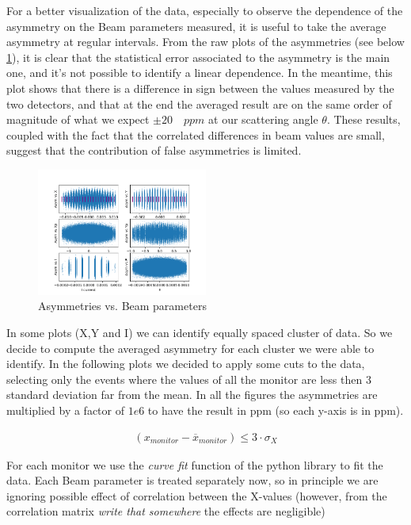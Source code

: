 For a better visualization of the data, especially to observe the dependence of the asymmetry on the Beam parameters measured, it is useful to take the average asymmetry at regular intervals. From the raw plots of the asymmetries (see below \ref{fig:asyvsparam}), it is clear that the statistical error associated to the asymmetry is the main one, and it's not possible to identify a linear dependence. In the meantime, this plot shows that there is a difference in sign between the values ​​measured by the two detectors, and that at the end the averaged result are on the same order of magnitude of what we expect $\pm 20 \quad ppm$ at our scattering angle $\theta$. These results, coupled with the fact that the correlated differences in beam values ​​are small, suggest that the contribution of false asymmetries is limited.

\begin{figure}[hbtp]
\centering
\includegraphics[width = 0.5\textwidth]{Analysis/Asym_vs_monitor.png}
\caption{Asymmetries vs. Beam parameters}
\label{fig:asyvsparam}
\end{figure}

In some plots (X,Y and I) we can identify equally spaced cluster of data. So we decide to compute the averaged asymmetry for each cluster we were able to identify. 
In the following plots we decided to apply some cuts to the data, selecting only the events where the values of all the monitor are less then 3 standard deviation far from the mean. In all the figures the asymmetries are multiplied by a factor of $1e6$ to have the result in ppm (so each y-axis is in ppm). 

\begin{align*}
(x_{monitor} - \overline{x}_{monitor}) \leq 3 \cdot \sigma_{X}
\end{align*}

For each monitor we use the \textit{curve fit} function of the python library  to fit the data. Each Beam parameter is treated separately now, so in principle we are ignoring possible effect of correlation between the X-values (however, from the correlation matrix    \textit{write that somewhere} the effects are negligible)  

